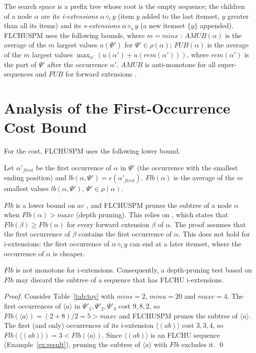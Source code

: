 \documentclass[runningheads]{llncs}
\newcommand{\FL}{\textsc{FLCHUSPM}}
\newcommand{\amub}{\ensuremath{\mathit{AMUB}}}
\newcommand{\fub}{\ensuremath{\mathit{FUB}}}
\newcommand{\flb}{\ensuremath{\mathit{Flb}}}
\newcommand{\ac}{\ensuremath{\mathit{ac}}}
\newcommand{\minu}{\ensuremath{\mathit{minu}}}
\newcommand{\maxc}{\ensuremath{\mathit{maxc}}}
\newcommand{\mins}{\ensuremath{\mathit{mins}}}
\newcommand{\seq}[1]{\langle #1\rangle}
\begin{document}
The search space is a prefix tree whose root is the empty sequence; the children of a node
$\alpha$ are its \emph{i-extensions} $\alpha \diamond_i y$ (item $y$ added to the last itemset,
$y$ greater than all its items) and its \emph{s-extensions} $\alpha \diamond_s y$ (a new itemset
$\{y\}$ appended). \FL{} uses the following bounds, where $m = \mins$ \cite{truong2022}:
$\amub(\alpha)$ is the average of the $m$ largest values $u(\Psi')$ for
$\Psi' \in \rho(\alpha)$; $\fub(\alpha)$ is the average of the $m$ largest values
$\max_{\alpha'}(u(\alpha') + u(\mathit{rem}(\alpha')))$, where $\mathit{rem}(\alpha')$ is the
part of $\Psi'$ after the occurrence $\alpha'$. \amub{} is anti-monotone for all
super-sequences and \fub{} for forward extensions \cite[Theorem~1]{truong2022}.

\section{Analysis of the First-Occurrence Cost Bound}\label{sec:flb}

For the cost, \FL{} uses the following lower bound.

\begin{definition}
Let $\alpha'_{\mathit{first}}$ be the first occurrence of $\alpha$ in $\Psi'$ (the occurrence
with the smallest ending position) and $\mathit{lb}(\alpha,\Psi') = c(\alpha'_{\mathit{first}})$.
$\flb(\alpha)$ is the average of the $m$ smallest values $\mathit{lb}(\alpha,\Psi')$,
$\Psi' \in \rho(\alpha)$.
\end{definition}

\flb{} is a lower bound on $\ac$ \cite[Theorem~2a]{truong2022}, and \FL{} prunes the subtree
of a node $\alpha$ when $\flb(\alpha) > \maxc$ (depth pruning). This relies on
\cite[Theorem~2b]{truong2022}, which states that $\flb(\beta) \ge \flb(\alpha)$ for every
forward extension $\beta$ of $\alpha$. The proof assumes that the first occurrence of $\beta$
contains the first occurrence of $\alpha$. This does not hold for i-extensions: the first
occurrence of $\alpha \diamond_i y$ can end at a later itemset, where the occurrence of
$\alpha$ is cheaper.

\begin{proposition}\label{prop:cex}
\flb{} is not monotone for i-extensions. Consequently, a depth-pruning test based on \flb{}
may discard the subtree of a sequence that has FLCHU i-extensions.
\end{proposition}
\begin{proof}
Consider Table~\ref{tab:toy} with $\mins = 2$, $\minu = 20$ and $\maxc = 4$. The first
occurrences of $\seq{a}$ in $\Psi'_1, \Psi'_2, \Psi'_3$ cost $9, 8, 2$, so
$\flb(\seq{a}) = (2 + 8)/2 = 5 > \maxc$ and \FL{} prunes the subtree of $\seq{a}$. The first
(and only) occurrences of its i-extension $\seq{(ab)}$ cost $3, 3, 4$, so
$\flb(\seq{(ab)}) = 3 < \flb(\seq{a})$. Since $\seq{(ab)}$ is an FLCHU sequence
(Example~\ref{ex:result}), pruning the subtree of $\seq{a}$ with \flb{} excludes it. \qed
\end{proof}
\end{document}
